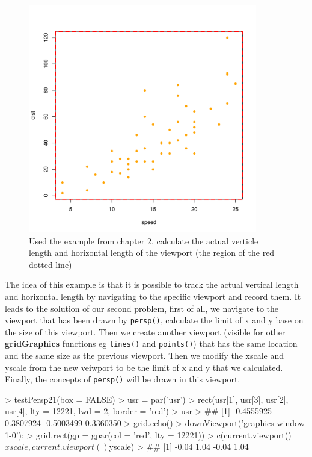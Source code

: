 \documentclass[paper=a4, fontsize=11pt]{report}
\begin{document}
\begin{figure}[h]
	\begin{center}
		\includegraphics[height = 10cm, width = 10cm]{figure/gridGraphics_persp_demo_1.pdf}
		\caption{Used the example from chapter 2, calculate the actual verticle length and horizontal length of the viewport (the region of the red dotted line)}
		\label{figure_4.2}
	\end{center}
\end{figure}

The idea of this example is that it is possible to track the actual vertical length and horizontal length by navigating to the specific viewport and record them. It leads to the solution of our second problem, first of all, we navigate to the viewport that has been drawn by \texttt{persp()}, calculate the limit of x and y base on the size of this viewport. Then we create another viewport (visible for other \textbf{gridGraphics} functions eg \texttt{lines()} and \texttt{points()}) that has the same location and the same size as the previous viewport. Then we modify the xscale and yscale from the new veiwport to be the limit of x and y that we calculated. Finally, the concepts of \texttt{persp()} will be drawn in this viewport. \\

\begin{Schunk}
\begin{Sinput}
> testPersp21(box = FALSE)
> usr = par('usr')
> rect(usr[1], usr[3], usr[2], usr[4], lty = 12221, lwd = 2, border = 'red')
> usr
> ## [1] -0.4555925  0.3807924 -0.5003499  0.3360350
> grid.echo()
> downViewport('graphics-window-1-0'); 
> grid.rect(gp = gpar(col = 'red', lty = 12221))
> c(current.viewport()$xscale, current.viewport()$yscale)
> ## [1] -0.04  1.04 -0.04  1.04
\end{Sinput}
\end{Schunk}
\end{document}
